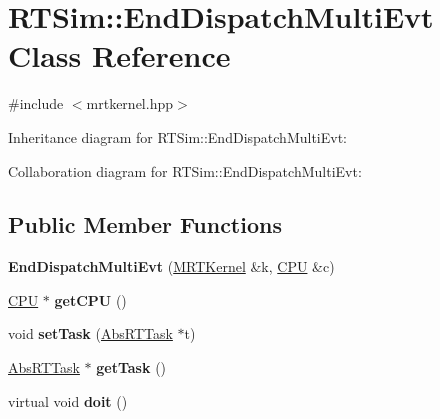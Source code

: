 \hypertarget{classRTSim_1_1EndDispatchMultiEvt}{}\section{R\+T\+Sim\+:\+:End\+Dispatch\+Multi\+Evt Class Reference}
\label{classRTSim_1_1EndDispatchMultiEvt}


{\ttfamily \#include $<$mrtkernel.\+hpp$>$}



Inheritance diagram for R\+T\+Sim\+:\+:End\+Dispatch\+Multi\+Evt\+:


Collaboration diagram for R\+T\+Sim\+:\+:End\+Dispatch\+Multi\+Evt\+:
\subsection*{Public Member Functions}
\begin{DoxyCompactItemize}
\item 
{\bfseries End\+Dispatch\+Multi\+Evt} (\hyperlink{classRTSim_1_1MRTKernel}{M\+R\+T\+Kernel} \&k, \hyperlink{classRTSim_1_1CPU}{C\+PU} \&c)\hypertarget{classRTSim_1_1EndDispatchMultiEvt_a2b512e9fde718f4535a17921488c8941}{}\label{classRTSim_1_1EndDispatchMultiEvt_a2b512e9fde718f4535a17921488c8941}

\item 
\hyperlink{classRTSim_1_1CPU}{C\+PU} $\ast$ {\bfseries get\+C\+PU} ()\hypertarget{classRTSim_1_1EndDispatchMultiEvt_a7d777e70b7fd9c59dd2ab29a2c007dee}{}\label{classRTSim_1_1EndDispatchMultiEvt_a7d777e70b7fd9c59dd2ab29a2c007dee}

\item 
void {\bfseries set\+Task} (\hyperlink{classRTSim_1_1AbsRTTask}{Abs\+R\+T\+Task} $\ast$t)\hypertarget{classRTSim_1_1EndDispatchMultiEvt_a5ea43ec6e80c581d053edb4270a8ceb0}{}\label{classRTSim_1_1EndDispatchMultiEvt_a5ea43ec6e80c581d053edb4270a8ceb0}

\item 
\hyperlink{classRTSim_1_1AbsRTTask}{Abs\+R\+T\+Task} $\ast$ {\bfseries get\+Task} ()\hypertarget{classRTSim_1_1EndDispatchMultiEvt_aee122683cb4cfd2c50e362183eaaf592}{}\label{classRTSim_1_1EndDispatchMultiEvt_aee122683cb4cfd2c50e362183eaaf592}

\item 
virtual void {\bfseries doit} ()\hypertarget{classRTSim_1_1EndDispatchMultiEvt_a3ab68baa99813232c1ede82a636f112b}{}\label{classRTSim_1_1EndDispatchMultiEvt_a3ab68baa99813232c1ede82a636f112b}

\end{DoxyCompactItemize}


